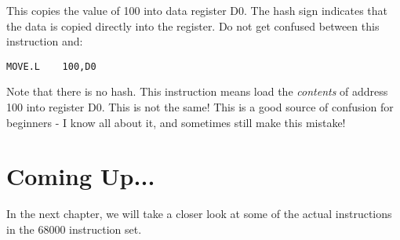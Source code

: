 This copies the value of 100 into data register D0. The hash sign
      indicates that the data is copied directly into the register. Do not get
      confused between this instruction and: 
\begin{lstlisting}[firstnumber=1,]
          MOVE.L    100,D0 
\end{lstlisting}


Note that there is no hash. This instruction means load the
      \textit{contents} of address 100 into register D0. This is not the same! This is
      a good source of confusion for beginners -{} I know all about it, and
      sometimes still make this mistake!

\section{Coming Up...}
\label{ch1-the-end}%

In the next chapter, we will take a closer
    look at some of the actual instructions in the 68000 instruction
    set.
